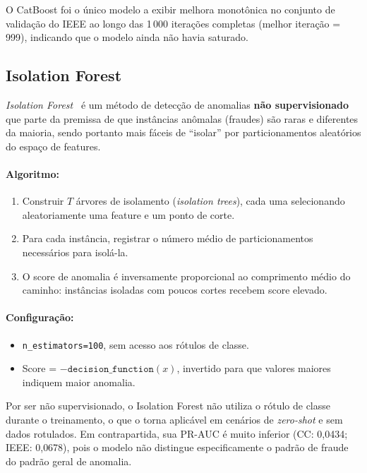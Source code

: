 \documentclass[12pt,a4paper]{article}
\newcommand{\algo}[1]{\textit{#1}}
\begin{document}
O CatBoost foi o único modelo a exibir melhora monotônica no conjunto de
validação do IEEE ao longo das 1\,000 iterações completas (melhor iteração = 999),
indicando que o modelo ainda não havia saturado.

\subsection{Isolation Forest}
\label{sec:isoforest}

\algo{Isolation Forest}~\cite{liu2008isolation} é um método de detecção de
anomalias \textbf{não supervisionado} que parte da premissa de que instâncias
anômalas (fraudes) são raras e diferentes da maioria, sendo portanto mais
fáceis de ``isolar'' por particionamentos aleatórios do espaço de features.

\paragraph{Algoritmo:}
\begin{enumerate}[nosep]
  \item Construir $T$ árvores de isolamento (\textit{isolation trees}), cada
    uma selecionando aleatoriamente uma feature e um ponto de corte.
  \item Para cada instância, registrar o número médio de particionamentos
    necessários para isolá-la.
  \item O score de anomalia é inversamente proporcional ao comprimento médio do
    caminho: instâncias isoladas com poucos cortes recebem score elevado.
\end{enumerate}

\paragraph{Configuração:}
\begin{itemize}[nosep]
  \item \texttt{n\_estimators=100}, sem acesso aos rótulos de classe.
  \item Score = $-\texttt{decision\_function}(x)$, invertido para que valores
    maiores indiquem maior anomalia.
\end{itemize}

Por ser não supervisionado, o Isolation Forest não utiliza o rótulo de classe
durante o treinamento, o que o torna aplicável em cenários de \textit{zero-shot}
e sem dados rotulados. Em contrapartida, sua PR-AUC é muito inferior (CC:
0{,}0434; IEEE: 0{,}0678), pois o modelo não distingue especificamente o padrão
de fraude do padrão geral de anomalia.
\end{document}
